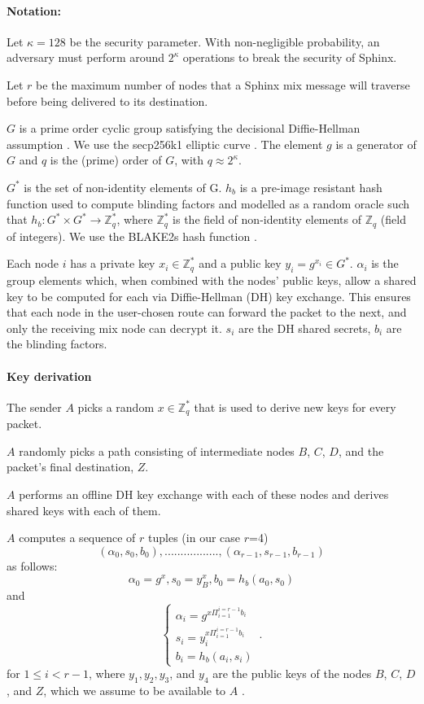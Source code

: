 \paragraph{Notation:}Let $\kappa=128$ be the security parameter. With non-negligible probability, an adversary must perform around $2^\kappa$ operations to break the security of Sphinx.

Let $r$ be the maximum number of nodes that a Sphinx mix message will traverse before being delivered to its destination.

$G$ is a prime order cyclic group satisfying the decisional Diffie-Hellman assumption \cite{Boneh_1998}. We use the secp256k1 elliptic curve \cite{sec2}. The element $g$ is a generator of $G$ and $q$ is the (prime) order of $G$, with $q\approx2^{\kappa}$.

$G^*$ is the set of non-identity elements of G. $h_b$ is a pre-image resistant hash function used to compute blinding factors and modelled as a random oracle such that
$h_b:G^*\times G^*\rightarrow\mathbb{Z}^*_q$, where $\mathbb{Z}^*_q$ is the field of non-identity elements of $\mathbb{Z}_q$ (field of integers). We use the BLAKE2s hash function \cite{blake2}.

Each node $i$ has a private key $x_{i}\in \mathbb{Z}^*_q$ and a public key $y_{i}=g^{x_{i}}\in G^*$.
$\alpha_i$ is the group elements which, when combined with the nodes’ public keys, allow a shared key to be computed for each via Diffie-Hellman (DH) key exchange. This ensures that each node in the user-chosen route can forward the packet to the next, and only the receiving mix node can decrypt it.
$s_i$ are the DH shared secrets, $b_i$ are the blinding factors.

\paragraph{Key derivation}
The sender $A$ picks a random $x\in \mathbb{Z}^*_q$ that is used to derive new keys for every packet.

$A$ randomly picks a path consisting of intermediate nodes $B$, $C$, $D$, and the packet's final destination, $Z$.

$A$ performs an offline DH key exchange with each of these nodes and derives shared keys with each of them.

$A$ computes a sequence of $r$ tuples (in our case $r$=4)  $$(\alpha_0,s_0,b_0),.................,(\alpha_{r-1},s_{r-1},b_{r-1})$$ as follows:
$$\alpha_0=g^x,s_0=y^x_B,b_0=h_b(a_0,s_0)$$
and
\begin{equation}
    \begin{cases}
        \alpha_i=g^{x\Pi_{i=1}^{i=r-1}b_i}\\
        s_i=y^{x\Pi_{i=1}^{i=r-1}b_i}_i \\
        b_i=h_b(a_i,s_i)
    \end{cases}\,.
    \label{eq:1}
\end{equation}
for $1\le i < r-1$, where $y_1, y_2, y_3$, and $y_4$ are the public keys of the nodes $B$, $C$, $D$, and $Z$, which we assume to be available to $A$ .

